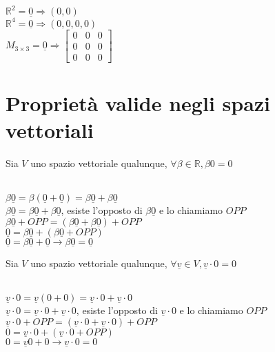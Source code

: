 \begin{es}
	\phantom{}\\
	$\mathbb{R}^2=\underline{0} \Rightarrow (0,0)$\\
	$\mathbb{R}^4=\underline{0} \Rightarrow (0,0,0,0)$\\
	$M_{3\times3}=\underline{0} \Rightarrow 
	\begin{bmatrix}
    0 & 0 & 0 \\
	0 & 0 & 0 \\
	0 & 0 & 0
	\end{bmatrix}$
\end{es}

\section{Proprietà valide negli spazi vettoriali}

\begin{proposizione}
	Sia $V$ uno spazio vettoriale qualunque, $\forall\beta\in\mathbb{R}, \beta 0=0$\\
    \begin{dimostrazione}
    	\phantom{}\\
    	$\beta \underline{0}=\beta(\underline{0}+\underline{0})=\beta \underline{0}+\beta \underline{0}$\\
    	$\beta \underline{0}=\beta \underline{0}+\beta \underline{0}$, esiste l'opposto di $\beta \underline{0}$ e lo chiamiamo $OPP$\\
    	$\beta \underline{0}+ OPP=(\beta \underline{0}+\beta \underline{0})+OPP$\\
    	$\underline{0}=\beta \underline{0}+(\beta \underline{0}+OPP)$\\
    	$\underline{0}=\beta \underline{0}+\underline{0}\rightarrow \beta \underline{0}=\underline{0}$
    \end{dimostrazione}
\end{proposizione}

\begin{proposizione}
	Sia $V$ uno spazio vettoriale qualunque, $\forall \underline{v}\in V, \underline{v}\cdot0=0$\\
	\begin{dimostrazione}
		\phantom{}\\
		$\underline{v}\cdot0=\underline{v}(0+0)=\underline{v}\cdot0+\underline{v}\cdot0$\\
		$\underline{v}\cdot0=\underline{v}\cdot0+\underline{v}\cdot0$, esiste l'opposto di $\underline{v}\cdot0$ e lo chiamiamo $OPP$\\
		$\underline{v}\cdot0+ OPP=(\underline{v}\cdot0+\underline{v}\cdot0)+OPP$\\
		$0=\underline{v}\cdot0+(\underline{v}\cdot0+OPP)$\\
		$0=\underline{v} 0+0\rightarrow \underline{v}\cdot0=0$
	\end{dimostrazione}
\end{proposizione}


